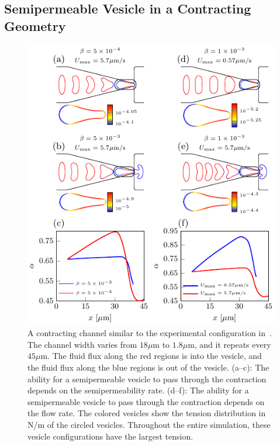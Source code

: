 \documentclass[9pt,twocolumn,twoside,lineno]{pnas-new}
\newif\ifTikz
\begin{document}
\subsection*{Semipermeable Vesicle in a Contracting Geometry} 
\begin{figure}[htp]
  \centering
  \ifTikz
  
  \else
  \includegraphics{figures/contractingComposite.pdf}
  \fi
  \caption{\label{fig:contractingComposite} A contracting channel
  similar to the experimental configuration in~\cite{wu2015critical}. The
  channel width varies from $18\mu$m to $1.8\mu$m, and it repeats every
  $45\mu$m. The fluid flux along the red regions is into the vesicle,
  and the fluid flux along the blue regions is out of the vesicle.
  (a--c): The ability for a semipermeable vesicle to pass through the
  contraction depends on the semipermeability rate. (d--f): The ability
  for a semipermeable vesicle to pass through the contraction depends
  on the flow rate. The colored vesicles show the tension distribution
  in N/m of the circled vesicles. Throughout the entire simulation,
  these vesicle configurations have the largest tension.}
\end{figure}
\end{document}
